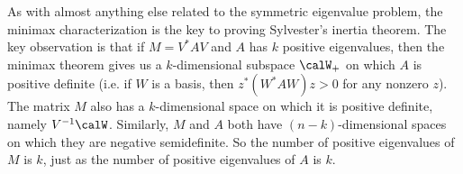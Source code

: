 \documentclass[12pt, leqno]{article} %
\begin{document}
As with almost anything else related to the symmetric eigenvalue
problem, the minimax characterization is the key to proving
Sylvester's inertia theorem.  The key observation is that if
$M = V^* A V$ and $A$ has $k$ positive eigenvalues, then the minimax theorem
gives us a $k$-dimensional subspace $\calW_+$ on which $A$ is positive
definite (i.e. if $W$ is a basis, then $z^* (W^* A W) z > 0$ for any
nonzero $z$).  The matrix $M$ also has a $k$-dimensional space on
which it is positive definite, namely $V^{-1} \calW$.  Similarly, $M$
and $A$ both have $(n-k)$-dimensional spaces on which they are
negative semidefinite.  So the number of positive eigenvalues of $M$
is $k$, just as the number of positive eigenvalues of $A$ is $k$.
\end{document}
